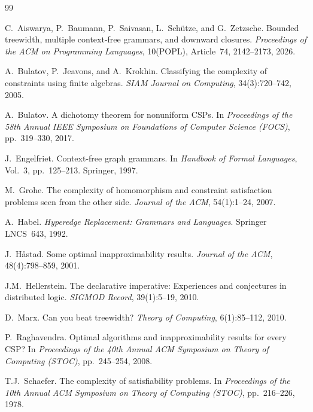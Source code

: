 \documentclass[11pt,a4paper]{article}
\theoremstyle{plain}
\theoremstyle{definition}
\theoremstyle{remark}
\begin{document}
\begin{thebibliography}{99}

C.~Aiswarya, P.~Baumann, P.~Saivasan, L.~Sch\"utze, and G.~Zetzsche.
\newblock Bounded treewidth, multiple context-free grammars, and downward closures.
\newblock \emph{Proceedings of the ACM on Programming Languages}, 10(POPL), Article~74, 2142--2173, 2026.

A.~Bulatov, P.~Jeavons, and A.~Krokhin.
\newblock Classifying the complexity of constraints using finite algebras.
\newblock \emph{SIAM Journal on Computing}, 34(3):720--742, 2005.

A.~Bulatov.
\newblock A dichotomy theorem for nonuniform CSPs.
\newblock In \emph{Proceedings of the 58th Annual IEEE Symposium on Foundations of Computer Science (FOCS)}, pp.~319--330, 2017.

J.~Engelfriet.
\newblock Context-free graph grammars.
\newblock In \emph{Handbook of Formal Languages}, Vol.~3, pp.~125--213. Springer, 1997.

M.~Grohe.
\newblock The complexity of homomorphism and constraint satisfaction problems seen from the other side.
\newblock \emph{Journal of the ACM}, 54(1):1--24, 2007.

A.~Habel.
\newblock \emph{Hyperedge Replacement: Grammars and Languages}.
\newblock Springer LNCS~643, 1992.

J.~H\aa stad.
\newblock Some optimal inapproximability results.
\newblock \emph{Journal of the ACM}, 48(4):798--859, 2001.

J.M.~Hellerstein.
\newblock The declarative imperative: Experiences and conjectures in distributed logic.
\newblock \emph{SIGMOD Record}, 39(1):5--19, 2010.

D.~Marx.
\newblock Can you beat treewidth?
\newblock \emph{Theory of Computing}, 6(1):85--112, 2010.

P.~Raghavendra.
\newblock Optimal algorithms and inapproximability results for every CSP?
\newblock In \emph{Proceedings of the 40th Annual ACM Symposium on Theory of Computing (STOC)}, pp.~245--254, 2008.

T.J.~Schaefer.
\newblock The complexity of satisfiability problems.
\newblock In \emph{Proceedings of the 10th Annual ACM Symposium on Theory of Computing (STOC)}, pp.~216--226, 1978.


\end{thebibliography}
\end{document}
